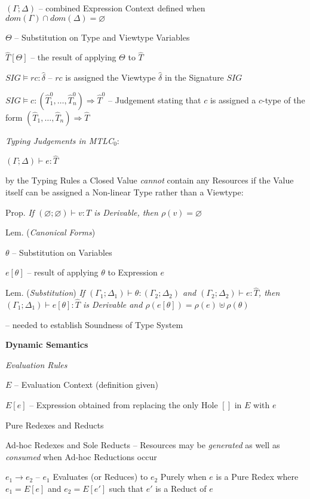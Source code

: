 $(\Gamma;\Delta)$ -- combined Expression Context defined when
$dom(\Gamma) \cap dom(\Delta) = \varnothing$

$\Theta$ -- Substitution on Type and Viewtype Variables %

$\hat{T}[\Theta]$ -- the result of applying $\Theta$ to $\hat{T}$

$SIG \vDash rc : \hat{\delta}$ -- $rc$ is assigned the Viewtype
$\hat{\delta}$ in the Signature $SIG$

$SIG \vDash c : (\hat{T}^0_1, \ldots, \hat{T}^0_n) \Rightarrow
\hat{T}^0$ -- Judgement stating that $c$ is assigned a $c$-type of the
form $(\hat{T}_1, \ldots, \hat{T}_n) \Rightarrow \hat{T}$

\emph{Typing Judgements in MTLC$_0$}:

$(\Gamma;\Delta) \vdash e : \hat{T}$

by the Typing Rules a Closed Value \emph{cannot} contain any Resources
if the Value itself can be assigned a Non-linear Type rather than a
Viewtype:

Prop. \emph{If $(\varnothing;\varnothing) \vdash v : T$ is Derivable,
  then $\rho(v) = \varnothing$}

Lem. (\emph{Canonical Forms})

$\theta$ -- Substitution on Variables

$e[\theta]$ -- result of applying $\theta$ to Expression $e$

Lem. (\emph{Substitution}) \emph{If $(\Gamma_1;\Delta_1) \vdash \theta
  : (\Gamma_2;\Delta_2)$ and $(\Gamma_2;\Delta_2) \vdash e : \hat{T}$,
  then $(\Gamma_1;\Delta_1) \vdash e[\theta] : \hat{T}$ is Derivable
  and $\rho(e[\theta]) = \rho(e) \uplus \rho(\theta)$}

-- needed to establish Soundness of Type System


\textbf{Dynamic Semantics}

\emph{Evaluation Rules}

$E$ -- Evaluation Context (definition given)

$E[e]$ -- Expression obtained from replacing the only Hole $[]$ in $E$
with $e$

Pure Redexes and Reducts

Ad-hoc Redexes and Sole Reducts -- Resources may be \emph{generated}
as well as \emph{consumed} when Ad-hoc Reductions occur

$e_1 \rightarrow e_2$ -- $e_1$ Evaluates (or Reduces) to $e_2$ Purely
when $e$ is a Pure Redex where $e_1 = E[e]$ and $e_2 = E[e']$ such
that $e'$ is a Reduct of $e$

